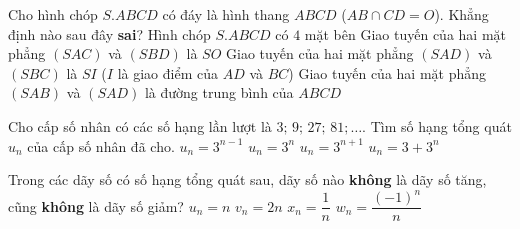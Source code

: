 \begin{ex}%
Cho hình chóp $S.ABCD$ có đáy là hình thang $ABCD$ ($AB \cap CD = O$). Khẳng định nào sau đây \textbf{sai}?
\choice
{Hình chóp $S.ABCD$ có $4$ mặt bên}
{Giao tuyến của hai mặt phẳng $(SAC)$ và $(SBD)$ là $SO$}
{Giao tuyến của hai mặt phẳng $(SAD)$ và $(SBC)$ là $SI$ ($I$ là giao điểm của $AD$ và $BC$)}
{\True Giao tuyến của hai mặt phẳng $(SAB)$ và $(SAD)$ là đường trung bình của $ABCD$}
\end{ex}

\begin{ex}%
Cho cấp số nhân có các số hạng lần lượt là $ 3;\, 9;\, 27;\, 81;\ldots$. Tìm số hạng tổng quát $u_n$ của cấp số nhân đã cho.
\choice
{$u_n=3^{n-1}$}
{\True $u_n=3^n$}
{$u_n=3^{n+1}$}
{$u_n=3+3^n$}
\end{ex}

\begin{ex}%
Trong các dãy số có số hạng tổng quát sau, dãy số nào {\bf không} là dãy số tăng, cũng {\bf không} là dãy số giảm?
\choice
{$u_n=n$}
{$v_n=2n$}
{$x_n=\dfrac{1}{n}$}
{\True $w_n=\dfrac{\left(-1\right)^n}{n}$}
\end{ex}


